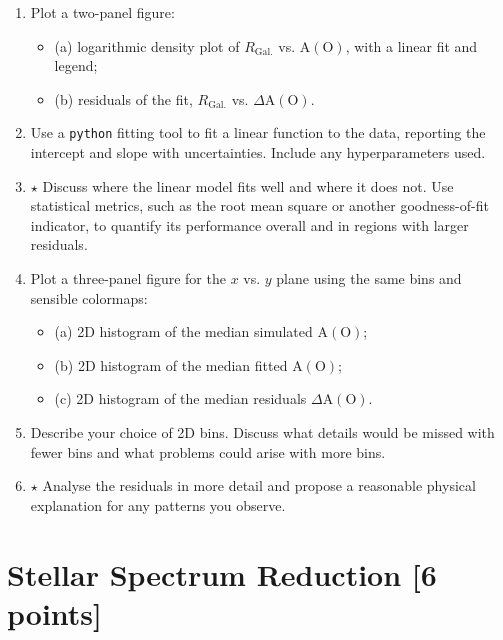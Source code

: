 \documentclass[a4paper,12pt]{article}
\begin{document}
\begin{enumerate}[leftmargin=0.7cm]

\item Plot a two-panel figure:
    \begin{itemize}
        \item (a) logarithmic density plot of $R_\mathrm{Gal.}$ vs. $\mathrm{A(O)}$, with a linear fit and legend;
        \item (b) residuals of the fit, $R_\mathrm{Gal.}$ vs. $\Delta\mathrm{A(O)}$.
    \end{itemize}

\item Use a \texttt{python} fitting tool to fit a linear function to the data, reporting the intercept and slope with uncertainties. Include any hyperparameters used.

\item $\star$ Discuss where the linear model fits well and where it does not. Use statistical metrics, such as the root mean square or another goodness-of-fit indicator, to quantify its performance overall and in regions with larger residuals.

\item Plot a three-panel figure for the $x$ vs. $y$ plane using the same bins and sensible colormaps:
    \begin{itemize}
        \item (a) 2D histogram of the median simulated $\mathrm{A(O)}$;
        \item (b) 2D histogram of the median fitted $\mathrm{A(O)}$;
        \item (c) 2D histogram of the median residuals
        $\Delta\mathrm{A(O)}$.
    \end{itemize}

\item Describe your choice of 2D bins. Discuss what details would be missed with fewer bins and what problems could arise with more bins.

\item $\star$ Analyse the residuals in more detail and propose a reasonable physical explanation for any patterns you observe.

\end{enumerate}

\section{Stellar Spectrum Reduction \hfill [6 points]}
\end{document}
